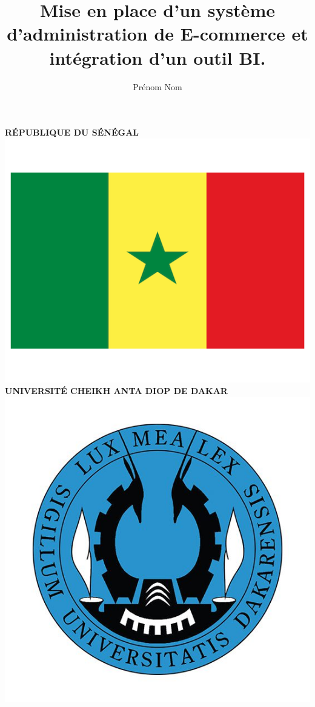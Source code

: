\documentclass[a4paper, 12pt]{report}
\title{Mise en place d'un système d'administration de E-commerce et intégration d'un outil BI.}
\author{Prénom Nom}
\date{}
\begin{document}
\begin{titlepage}

\centering %
 

\textsc{\normalsize \textbf{RÉPUBLIQUE DU SÉNÉGAL}}\\[0.15cm] %
\includegraphics[scale=.1]{img/flag}\\[0.15cm]
\textsc{\small \textbf{UNIVERSITÉ CHEIKH ANTA DIOP DE DAKAR}}\\[0.15cm]
\includegraphics[scale=.2]{img/ucad}\\[0.15cm] %

\end{titlepage}
\end{document}
